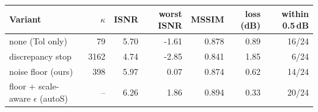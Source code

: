 \begin{tabular}{lrrrrrr}
\toprule
Variant & $\kappa$ & ISNR & worst ISNR & MSSIM & loss (dB) & within 0.5\,dB \\
\midrule
none (Tol only) & 79 & 5.70 & -1.61 & 0.878 & 0.89 & 16/24 \\
discrepancy stop & 3162 & 4.74 & -2.85 & 0.841 & 1.85 & 6/24 \\
noise floor (ours) & 398 & 5.97 & 0.07 & 0.874 & 0.62 & 14/24 \\
floor + scale-aware $\epsilon$ (autoS) & -- & 6.26 & 1.86 & 0.894 & 0.33 & 20/24 \\
\bottomrule
\end{tabular}